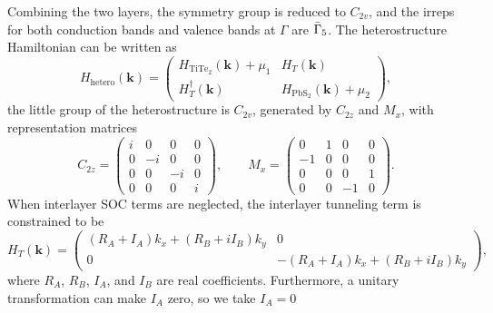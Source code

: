\documentclass[aps, preprint, prb,]{revtex4-2}
\begin{document}
Combining the two layers, the symmetry group is reduced to $C_{2v}$, and the irreps for both conduction bands and valence bands at $\Gamma$ are $\Bar{\Gamma}_5$. The heterostructure Hamiltonian can be written as
\begin{equation}
H_{\mathrm{hetero}}(\mathbf{k})=
\begin{pmatrix}
H_{\mathrm{TiTe}_2}(\mathbf{k})+\mu_1 & H_T(\mathbf{k})\\
H_T^\dagger(\mathbf{k}) & H_{\mathrm{PbS}_2}(\mathbf{k})+\mu_2
\end{pmatrix},
\end{equation}
the little group of the heterostructure is $C_{2v}$, generated by $C_{2z}$ and $M_x$, with representation matrices
\begin{equation}
C_{2z}=
\begin{pmatrix}
i & 0 & 0 & 0\\
0 & -i & 0 & 0\\
0 & 0 & -i & 0\\
0 & 0 & 0 & i
\end{pmatrix},
\qquad
M_x=
\begin{pmatrix}
0 & 1 & 0 & 0\\
-1 & 0 & 0 & 0\\
0 & 0 & 0 & 1\\
0 & 0 & -1 & 0
\end{pmatrix}.
\end{equation}
When interlayer SOC terms are neglected, the interlayer tunneling term is constrained to be
\begin{equation}
H_T(\mathbf{k})=
\begin{pmatrix}
(R_A+I_A) k_x + (R_B+iI_B)k_y & 0\\
0 & -(R_A+I_A) k_x + (R_B+iI_B)k_y
\end{pmatrix},
\end{equation}
where $R_A$, $R_B$, $I_A$, and $I_B$ are real coefficients. Furthermore, a unitary transformation can make $I_A$ zero, so we take $I_A=0$
\end{document}
